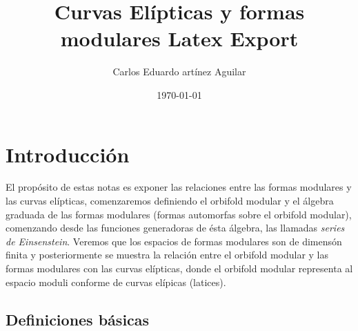\documentclass[letterpaper]{article}
\author{Carlos Eduardo artínez Aguilar}
\date{\today}
\title{Curvas Elípticas y formas modulares Latex Export}
\begin{document}
\maketitle
\tableofcontents


\section{Introducción}
\label{sec:org8993bad}
El propósito de estas notas es exponer las relaciones entre las formas modulares y las curvas elípticas, comenzaremos definiendo el orbifold modular y el álgebra graduada de las formas modulares (formas automorfas sobre el orbifold modular), comenzando desde las funciones generadoras de ésta álgebra, las llamadas \emph{series de Einsenstein}. Veremos que los espacios de formas modulares son de dimensón finita y posteriormente se muestra la relación entre el orbifold modular y las formas modulares con las curvas elípticas, donde el orbifold modular representa al espacio moduli conforme de curvas elípicas (latices).
\subsection{Definiciones básicas}
\label{sec:org13593e5}
\end{document}
